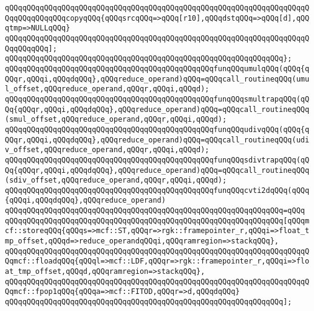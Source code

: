 \verb|qQQqqQQqqQQqqQQqqQQqqQQqqQQqqQQqqQQqqQQqqQQqqQQqqQQqqQQqqQQqqQQqqQQqqQQqqQQqqQQqqQQqcopyqQQq{qQQqsrcqQQq=>qQQq[r10],qQQqdstqQQq=>qQQq[d],qQQqtmp=>NULLqQQq}|\newline
\verb|qQQqqQQqqQQqqQQqqQQqqQQqqQQqqQQqqQQqqQQqqQQqqQQqqQQqqQQqqQQqqQQqqQQqqQQqqQQqqQQq];|\newline
\verb|qQQqqQQqqQQqqQQqqQQqqQQqqQQqqQQqqQQqqQQqqQQqqQQqqQQqqQQqqQQqqQQq};|\newline
\newline
\verb|qQQqqQQqqQQqqQQqqQQqqQQqqQQqqQQqqQQqqQQqqQQqqQQqfunqQQqumulqQQq(qQQq{qQQqr,qQQqi,qQQqdqQQq},qQQqreduce_operand)qQQq=qQQqcall_routineqQQq(umul_offset,qQQqreduce_operand,qQQqr,qQQqi,qQQqd);|\newline
\verb|qQQqqQQqqQQqqQQqqQQqqQQqqQQqqQQqqQQqqQQqqQQqqQQqfunqQQqsmultrapqQQq(qQQq{qQQqr,qQQqi,qQQqdqQQq},qQQqreduce_operand)qQQq=qQQqcall_routineqQQq(smul_offset,qQQqreduce_operand,qQQqr,qQQqi,qQQqd);|\newline
\verb|qQQqqQQqqQQqqQQqqQQqqQQqqQQqqQQqqQQqqQQqqQQqqQQqfunqQQqudivqQQq(qQQq{qQQqr,qQQqi,qQQqdqQQq},qQQqreduce_operand)qQQq=qQQqcall_routineqQQq(udiv_offset,qQQqreduce_operand,qQQqr,qQQqi,qQQqd);|\newline
\verb|qQQqqQQqqQQqqQQqqQQqqQQqqQQqqQQqqQQqqQQqqQQqqQQqfunqQQqsdivtrapqQQq(qQQq{qQQqr,qQQqi,qQQqdqQQq},qQQqreduce_operand)qQQq=qQQqcall_routineqQQq(sdiv_offset,qQQqreduce_operand,qQQqr,qQQqi,qQQqd);|\newline
\newline
\verb|qQQqqQQqqQQqqQQqqQQqqQQqqQQqqQQqqQQqqQQqqQQqqQQqfunqQQqcvti2dqQQq(qQQq{qQQqi,qQQqdqQQq},qQQqreduce_operand)|\newline
\verb|qQQqqQQqqQQqqQQqqQQqqQQqqQQqqQQqqQQqqQQqqQQqqQQqqQQqqQQqqQQqqQQq=qQQq|\newline
\verb|qQQqqQQqqQQqqQQqqQQqqQQqqQQqqQQqqQQqqQQqqQQqqQQqqQQqqQQqqQQqqQQq[qQQqmcf::storeqQQq{qQQqs=>mcf::ST,qQQqr=>rgk::framepointer_r,qQQqi=>float_tmp_offset,qQQqd=>reduce_operandqQQqi,qQQqramregion=>stackqQQq},|\newline
\verb|qQQqqQQqqQQqqQQqqQQqqQQqqQQqqQQqqQQqqQQqqQQqqQQqqQQqqQQqqQQqqQQqqQQqqQQqmcf::floadqQQq{qQQql=>mcf::LDF,qQQqr=>rgk::framepointer_r,qQQqi=>float_tmp_offset,qQQqd,qQQqramregion=>stackqQQq},|\newline
\verb|qQQqqQQqqQQqqQQqqQQqqQQqqQQqqQQqqQQqqQQqqQQqqQQqqQQqqQQqqQQqqQQqqQQqqQQqmcf::fpop1qQQq{qQQqa=>mcf::FITOD,qQQqr=>d,qQQqdqQQq}|\newline
\verb|qQQqqQQqqQQqqQQqqQQqqQQqqQQqqQQqqQQqqQQqqQQqqQQqqQQqqQQqqQQqqQQq];|\newline
